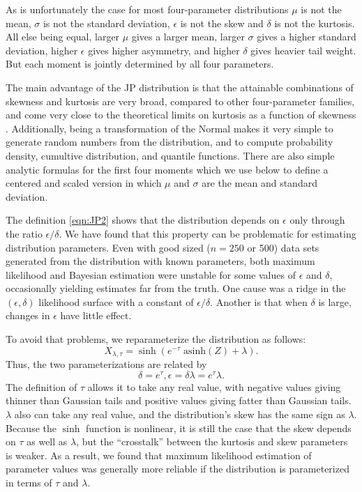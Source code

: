 \documentclass[12pt]{article}
\newcounter{box}
\newcommand{\be}{\begin{equation}}
\newcommand{\ee}{\end{equation}}
\begin{document}
As is unfortunately the case for most four-parameter distributions $\mu$ is not the mean, $\sigma$ is not the standard deviation, $\epsilon$ is not
the skew and $\delta$ is not the kurtosis. All else being equal, larger $\mu$  gives a larger mean, larger $\sigma$ gives a higher
standard deviation, higher $\epsilon$ gives higher asymmetry, and higher $\delta$ gives heavier tail weight.  But each moment is jointly determined 
by all four parameters. 

The main advantage of the JP distribution is that the attainable combinations of skewness and kurtosis are very broad, compared to other 
four-parameter families, and come very close to the theoretical limits on kurtosis as a function of skewness \citep[][Fig.  2]{jones-pewsey-2009}. 
Additionally, being a transformation of the Normal makes it very simple to generate random numbers from the distribution, and to compute 
probability density, cumultive distribution, and quantile functions. There are also simple analytic formulas for the first four moments
\citep[][p. 764]{jones-pewsey-2009} which we use below to define a centered and scaled version in which $\mu$ and $\sigma$ 
are the mean and standard deviation. 

The definition \eqref{eqn:JP2} shows that the distribution depends on $\epsilon$ only through the ratio $\epsilon/\delta$. We have found
that this property can be problematic for estimating distribution parameters. Even with good sized ($n=250$ or 500) data sets generated from the 
distribution with known parameters, both maximum likelihood and Bayesian estimation were unstable for some values of $\epsilon$ and $\delta$, 
occasionally yielding estimates far from the truth. One cause was a ridge in the $(\epsilon,\delta)$ likelihood surface with a constant of 
$\epsilon/\delta$. Another is that when $\delta$ is large,  changes in $\epsilon$ have little effect. 

To avoid that problems, we reparameterize the distribution as follows: 
\be
X_{\lambda,\tau} = \sinh \left( e^{-\tau} \; \mbox{asinh}(Z) + \lambda \right).
\label{eqn:SJP}
\ee
Thus, the two parameterizations are related by
\be
\delta = e^{\tau}, \epsilon= \delta \lambda =  e^{\tau} \lambda.
\ee
The definition of $\tau$ allows it to take any real value, with negative values giving thinner than Gaussian tails and positive
values giving fatter than Gaussian tails. $\lambda$ also can take any real value, and the distribution's skew has the same sign as $\lambda$. 
Because the $\sinh$ function is nonlinear, it is still the case that the skew depends on $\tau$ as well as $\lambda$, but the
``crosstalk'' between the kurtosis and skew parameters is weaker. As  a result, we found that maximum likelihood estimation of parameter values was 
generally more reliable if the distribution is parameterized in terms of $\tau$ and $\lambda$. 
\end{document}
